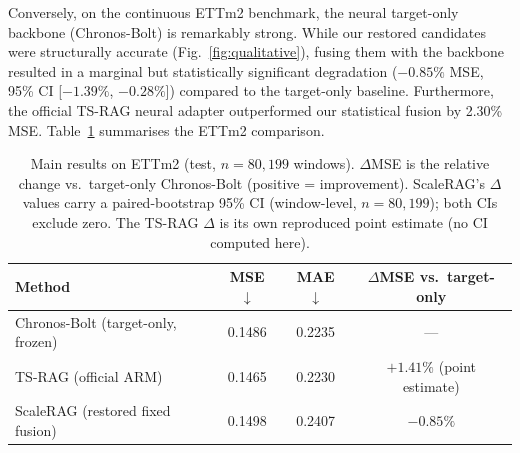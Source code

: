 \documentclass[twocolumn]{svjour3}          %
\begin{document}
Conversely, on the continuous ETTm2 benchmark, the neural target-only backbone (Chronos-Bolt) is remarkably strong. While our restored candidates were structurally accurate (Fig.~\ref{fig:qualitative}), fusing them with the backbone resulted in a marginal but statistically significant degradation ($-0.85\%$ MSE, 95\% CI [$-1.39\%$, $-0.28\%$]) compared to the target-only baseline. Furthermore, the official TS-RAG neural adapter outperformed our statistical fusion by 2.30\% MSE. Table~\ref{tab:main-results} summarises the ETTm2 comparison.

\begin{table}[t]
  \centering
  \caption{Main results on ETTm2 (test, $n=80{,}199$ windows). $\Delta$MSE is the relative
    change vs.\ target-only Chronos-Bolt (positive = improvement). ScaleRAG's $\Delta$ values
    carry a paired-bootstrap 95\% CI (window-level, $n=80{,}199$); both CIs exclude zero.
    The TS-RAG $\Delta$ is its own reproduced point estimate (no CI computed here).}
  \label{tab:main-results}
  \begin{tabular}{@{}lccc@{}}
    \toprule
    Method & MSE $\downarrow$ & MAE $\downarrow$ & $\Delta$MSE vs.\ target-only \\
    \midrule
    Chronos-Bolt (target-only, frozen) & 0.1486 & 0.2235 & --- \\
    TS-RAG (official ARM)              & 0.1465 & 0.2230 & $+1.41\%$ (point estimate) \\
    ScaleRAG (restored fixed fusion)   & 0.1498 & 0.2407 & $-0.85\%$ \; [$-1.39\%$, $-0.28\%$] \\
    \bottomrule
  \end{tabular}
\end{table}
\end{document}
